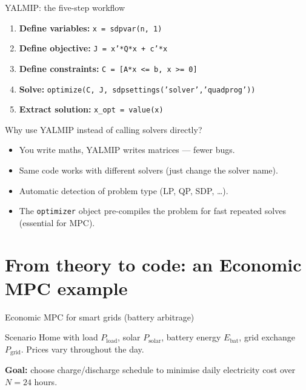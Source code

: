 \documentclass[aspectratio=169,10pt]{beamer}
\begin{document}
\begin{frame}{YALMIP: the five-step workflow}
\begin{enumerate}
  \item \textbf{Define variables:} \texttt{x = sdpvar(n, 1)}
  \item \textbf{Define objective:} \texttt{J = x'*Q*x + c'*x}
  \item \textbf{Define constraints:} \texttt{C = [A*x <= b, x >= 0]}
  \item \textbf{Solve:} \texttt{optimize(C, J, sdpsettings('solver','quadprog'))}
  \item \textbf{Extract solution:} \texttt{x\_opt = value(x)}
\end{enumerate}

\vspace{0.5em}
\begin{notebox}{Why use YALMIP instead of calling solvers directly?}
\begin{itemize}
  \item You write maths, YALMIP writes matrices --- fewer bugs.
  \item Same code works with different solvers (just change the solver name).
  \item Automatic detection of problem type (LP, QP, SDP, \ldots).
  \item The \texttt{optimizer} object pre-compiles the problem for fast repeated solves (essential for MPC).
\end{itemize}
\end{notebox}
\end{frame}

\section{From theory to code: an Economic MPC example}

\begin{frame}{Economic MPC for smart grids (battery arbitrage)}
\begin{examplebox}{Scenario}
Home with load $P_{\mathrm{load}}$, solar $P_{\mathrm{solar}}$, battery energy $E_{\mathrm{bat}}$, grid exchange $P_{\mathrm{grid}}$.
Prices vary throughout the day.
\end{examplebox}

\textbf{Goal:} choose charge/discharge schedule to minimise daily electricity cost over $N=24$ hours.
\end{frame}
\end{document}

